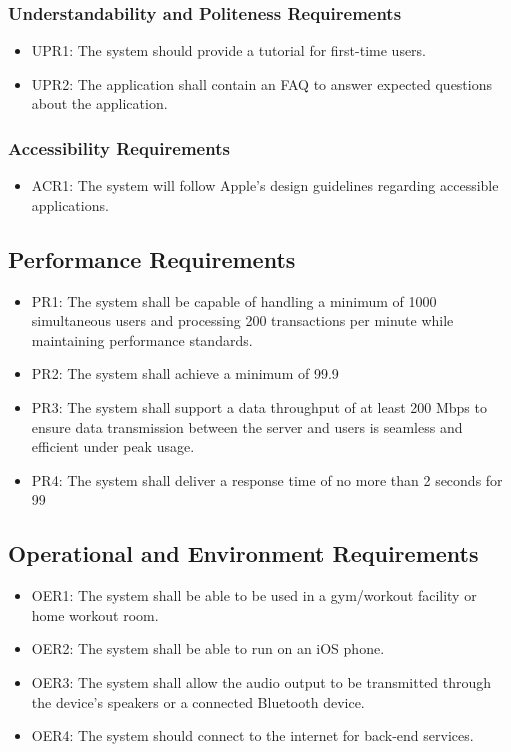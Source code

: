 \documentclass[12pt]{article}
\begin{document}
\subsubsection{Understandability and Politeness Requirements}
\begin{itemize}
\item UPR1: The system should provide a tutorial for first-time users.
\item UPR2: The application shall contain an FAQ to answer expected questions about the application.
\end{itemize}

\subsubsection{Accessibility Requirements}
\begin{itemize}
\item ACR1: The system will follow Apple’s design guidelines regarding accessible applications.
\end{itemize}

\subsection{Performance Requirements}
\begin{itemize}
\item PR1: The system shall be capable of handling a minimum of 1000 simultaneous users and processing 200 transactions per minute while maintaining performance standards.
\item PR2: The system shall achieve a minimum of 99.9%
\item PR3: The system shall support a data throughput of at least 200 Mbps to ensure data transmission between the server and users is seamless and efficient under peak usage.
\item PR4: The system shall deliver a response time of no more than 2 seconds for 99%
\end{itemize}

\subsection{Operational and Environment Requirements}
\begin{itemize}
\item OER1: The system shall be able to be used in a gym/workout facility or home workout room.
\item OER2: The system shall be able to run on an iOS phone.
\item OER3: The system shall allow the audio output to be transmitted through the device’s speakers or a connected Bluetooth device.
\item OER4: The system should connect to the internet for back-end services.
\end{itemize}
\end{document}
